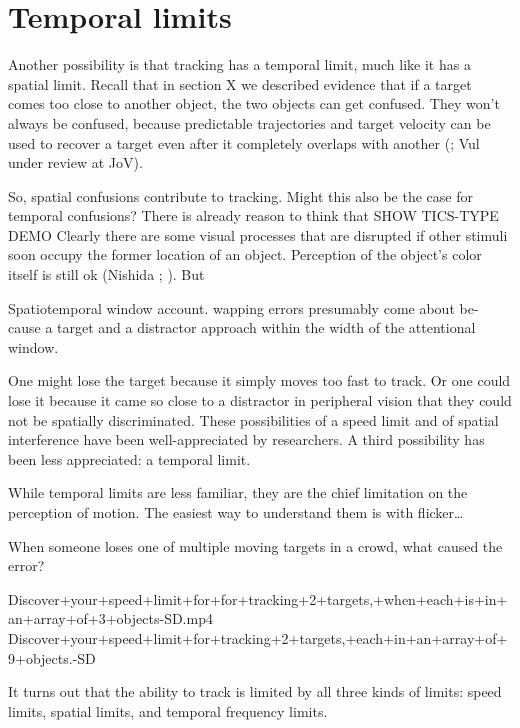 \documentclass[]{book}
\begin{document}
\hypertarget{temporal-limits}{%
\section{Temporal limits}\label{temporal-limits}}

Another possibility is that tracking has a temporal limit, much like it has a spatial limit. Recall that in section X we described evidence that if a target comes too close to another object, the two objects can get confused. They won't always be confused, because predictable trajectories and target velocity can be used to recover a target even after it completely overlaps with another (\citet{howeMotionInformationSometimes2012}; Vul under review at JoV).

So, spatial confusions contribute to tracking. Might this also be the case for temporal confusions? There is already reason to think that
SHOW TICS-TYPE DEMO
Clearly there are some visual processes that are disrupted if other stimuli soon occupy the former location of an object. Perception of the object's color itself is still ok (Nishida ; \citet{cavanaghMobileComputationSpatiotemporal2008}). But

Spatiotemporal window account.
wapping errors presumably come about be- cause a target and a distractor approach within the width of the attentional window.

One might lose the target because it simply moves too fast to track. Or one could lose it because it came so close to a distractor in peripheral vision that they could not be spatially discriminated. These possibilities of a speed limit and of spatial interference have been well-appreciated by researchers. A third possibility has been less appreciated: a temporal limit.

While temporal limits are less familiar, they are the chief limitation on the perception of motion. The easiest way to understand them is with flicker\ldots{}

When someone loses one of multiple moving targets in a crowd, what caused the error?

Discover+your+speed+limit+for+for+tracking+2+targets,+when+each+is+in+an+array+of+3+objects-SD.mp4
Discover+your+speed+limit+for+tracking+2+targets,+each+in+an+array+of+9+objects.-SD

It turns out that the ability to track is limited by all three kinds of limits: speed limits, spatial limits, and temporal frequency limits.
\end{document}
